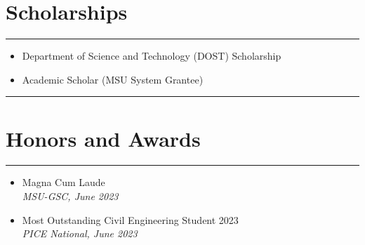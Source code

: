 {\section*{Scholarships}
\hrule
\vspace*{1em}
\begin{itemize}
    \item Department of Science and Technology (DOST) Scholarship
    \item Academic Scholar (MSU System Grantee)
\end{itemize}
\hrule
\section*{Honors and Awards}
\hrule
\vspace*{1em}
\begin{itemize}
    \item   Magna Cum Laude\\
            {\small \slshape MSU-GSC, June 2023}
    \item   Most Outstanding Civil Engineering Student 2023\\
            {\small \slshape PICE National, June 2023}
\end{itemize}
}
